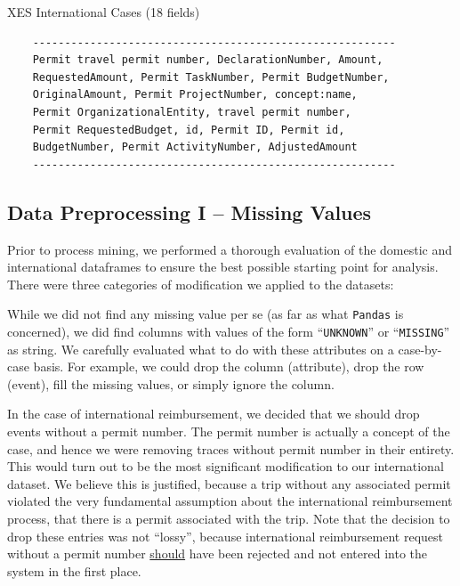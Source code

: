 \documentclass[conference]{IEEEtran}
\begin{document}
\begin{table}[htbp]
\caption{XES International Cases (18 fields)}
\begin{center}
\begin{verbatim}
    ---------------------------------------------------------
    Permit travel permit number, DeclarationNumber, Amount,
    RequestedAmount, Permit TaskNumber, Permit BudgetNumber,
    OriginalAmount, Permit ProjectNumber, concept:name,
    Permit OrganizationalEntity, travel permit number,
    Permit RequestedBudget, id, Permit ID, Permit id,
    BudgetNumber, Permit ActivityNumber, AdjustedAmount        
    ---------------------------------------------------------
\end{verbatim}
\end{center}
\label{table-international}
\end{table}

\subsection{Data Preprocessing I -- Missing Values}


Prior to process mining, we performed a thorough evaluation of the
domestic and international dataframes to ensure the best possible starting
point for analysis. There were three categories of modification we applied
to the datasets:

While we did not find any missing value per se (as far
as what \texttt{Pandas} is concerned), we did find columns with values of
the form ``\texttt{UNKNOWN}'' or ``\texttt{MISSING}'' as string. We
carefully evaluated what to do with these attributes on a case-by-case
basis. For example, we could drop the column (attribute), drop the row
(event), fill the missing values, or simply ignore the column.

In the case of international reimbursement, we decided that we should
drop events without a permit number. The permit number is actually a
concept of the case, and hence we were removing traces without permit
number in their entirety. This would turn out to be the most significant
modification to our international dataset.
We believe this is justified, because a trip
without any associated permit violated the very fundamental assumption
about the international reimbursement process, that there is a permit
associated with the trip. Note that the decision to drop these entries was
not ``lossy'', because international reimbursement request without a permit
number \underline{should} have been rejected and not entered into the system
in the first place.
\end{document}

